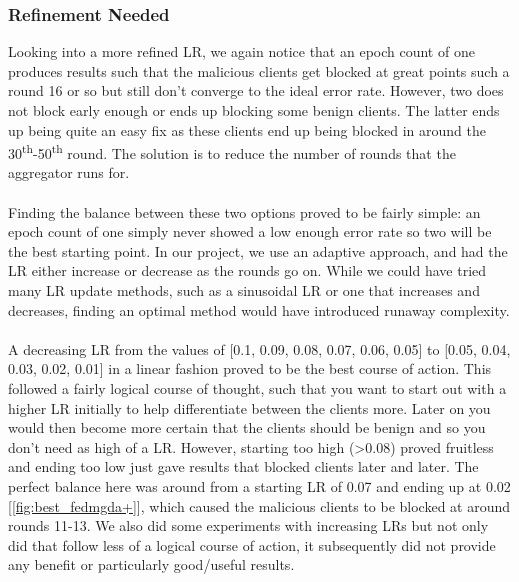 \subsubsection{Refinement Needed}
Looking into a more refined LR, we again notice that an epoch count of one produces results such that the malicious clients get blocked at great points such a round 16 or so but still don't converge to the ideal error rate.
However, two does not block early enough or ends up blocking some benign clients.
The latter ends up being quite an easy fix as these clients end up being blocked in around the 30\textsuperscript{th}-50\textsuperscript{th} round.
The solution is to reduce the number of rounds that the aggregator runs for.
\\ \\
Finding the balance between these two options proved to be fairly simple: an epoch count of one simply never showed a low enough error rate so two will be the best starting point.
In our project, we use an adaptive approach, and had the LR either increase or decrease as the rounds go on. 
While we could have tried many LR update methods, such as a sinusoidal LR or one that increases and decreases, finding an optimal method would have introduced runaway complexity.
\\ \\ 
A decreasing LR from the values of [0.1, 0.09, 0.08, 0.07, 0.06, 0.05] to [0.05, 0.04, 0.03, 0.02, 0.01] in a linear fashion proved to be the best course of action.
This followed a fairly logical course of thought, such that you want to start out with a higher LR initially to help differentiate between the clients more.
Later on you would then become more certain that the clients should be benign and so you don't need as high of a LR.
However, starting too high (\textgreater0.08) proved fruitless and ending too low just gave results that blocked clients later and later.
The perfect balance here was around from a starting LR of 0.07 and ending up at 0.02 [\ref{fig:best_fedmgda+}], which caused the malicious clients to be blocked at around rounds 11-13.
We also did some experiments with increasing LRs but not only did that follow less of a logical course of action, it subsequently did not provide any benefit or particularly good/useful results.

